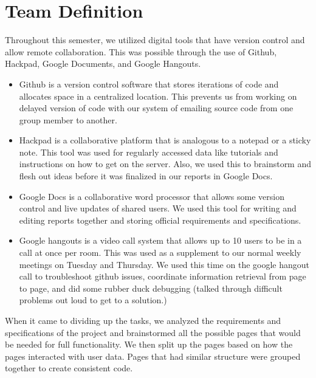 \documentclass[twocolumn,12pt]{article}
\begin{document}
\section{Team Definition}
Throughout this semester, we utilized digital tools that have version control and allow remote collaboration. This was possible through the use of Github, Hackpad, Google Documents, and Google Hangouts.

\begin{itemize}
\item Github is a version control software that stores iterations of code and allocates space in a centralized location.  This prevents us from working on delayed version of code with our system of emailing source code from one group member to another.

\item Hackpad is a collaborative platform that is analogous to a notepad or a sticky note. This tool was used for regularly accessed data like tutorials and instructions on how to get on the server.  Also, we used this to brainstorm and flesh out ideas before it was finalized in our reports in Google Docs.

\item Google Docs is a collaborative word processor that allows some version control and live updates of shared users. We used this tool for writing and editing reports together and storing official requirements and specifications.

\item Google hangouts is a video call system that allows up to 10 users to be in a call at once per room. This was used as a supplement to our normal weekly meetings on Tuesday and Thursday. We used this time on the google hangout call to troubleshoot github issues, coordinate information retrieval from page to page, and did some rubber duck debugging (talked through difficult problems out loud to get to a solution.)
\end{itemize}

When it came to dividing up the tasks, we analyzed the requirements and specifications of the project and brainstormed all the possible pages that would be needed for full functionality. We then split up the pages based on how the pages interacted with user data. Pages that had similar structure were grouped together to create consistent code. 
\end{document}
